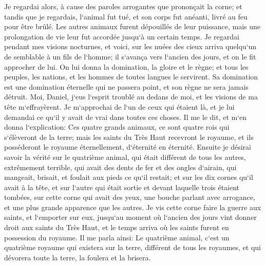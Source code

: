 \verse Je regardai alors, à cause des paroles arrogantes que prononçait la corne; et tandis que je regardais, l`animal fut tué, et son corps fut anéanti, livré au feu pour être brûlé. 
\verse Les autres animaux furent dépouillés de leur puissance, mais une prolongation de vie leur fut accordée jusqu`à un certain temps. 
\verse Je regardai pendant mes visions nocturnes, et voici, sur les nuées des cieux arriva quelqu`un de semblable à un fils de l`homme; il s`avança vers l`ancien des jours, et on le fit approcher de lui. 
\verse On lui donna la domination, la gloire et le règne; et tous les peuples, les nations, et les hommes de toutes langues le servirent. Sa domination est une domination éternelle qui ne passera point, et son règne ne sera jamais détruit. 
\verse Moi, Daniel, j`eus l`esprit troublé au dedans de moi, et les visions de ma tête m`effrayèrent. 
\verse Je m`approchai de l`un de ceux qui étaient là, et je lui demandai ce qu`il y avait de vrai dans toutes ces choses. Il me le dit, et m`en donna l`explication: 
\verse Ces quatre grands animaux, ce sont quatre rois qui s`élèveront de la terre; 
\verse mais les saints du Très Haut recevront le royaume, et ils posséderont le royaume éternellement, d`éternité en éternité. 
\verse Ensuite je désirai savoir la vérité sur le quatrième animal, qui était différent de tous les autres, extrêmement terrible, qui avait des dents de fer et des ongles d`airain, qui mangeait, brisait, et foulait aux pieds ce qu`il restait; 
\verse et sur les dix cornes qu`il avait à la tête, et sur l`autre qui était sortie et devant laquelle trois étaient tombées, sur cette corne qui avait des yeux, une bouche parlant avec arrogance, et une plus grande apparence que les autres. 
\verse Je vis cette corne faire la guerre aux saints, et l`emporter sur eux, 
\verse jusqu`au moment où l`ancien des jours vint donner droit aux saints du Très Haut, et le temps arriva où les saints furent en possession du royaume. 
\verse Il me parla ainsi: Le quatrième animal, c`est un quatrième royaume qui existera sur la terre, différent de tous les royaumes, et qui dévorera toute la terre, la foulera et la brisera. 

